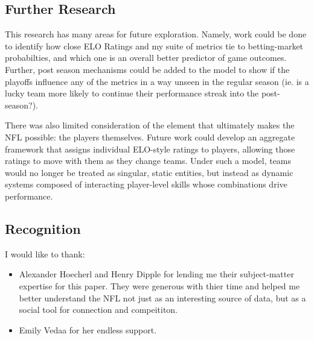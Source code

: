 \documentclass[a4paper,10.5pt,twoside]{article}
\begin{document}
\subsection{Further Research}

This research has many areas for future exploration. Namely, work could be done to identify how close ELO Ratings and my suite of metrics tie to betting-market probabilties, and which one is an overall better predictor of game outcomes. Further, post season mechanisms could be added to the model to show if the playoffs influence any of the metrics in a way unseen in the regular season (ie. is a lucky team more likely to continue their performance streak into the post-season?).

There was also limited consideration of the element that ultimately makes the NFL possible: the players themselves. Future work could develop an aggregate framework that assigns individual ELO-style ratings to players, allowing those ratings to move with them as they change teams. Under such a model, teams would no longer be treated as singular, static entities, but instead as dynamic systems composed of interacting player-level skills whose combinations drive performance.

\subsection{Recognition}
I would like to thank:

\begin{itemize}
    \item Alexander Hoecherl and Henry Dipple for lending me their subject-matter expertise for this paper. They were generous with thier time and helped me better understand the NFL not just as an interesting source of data, but as a social tool for connection and compeititon.
    \item Emily Vedaa for her endless support.
\end{itemize}
\end{document}
